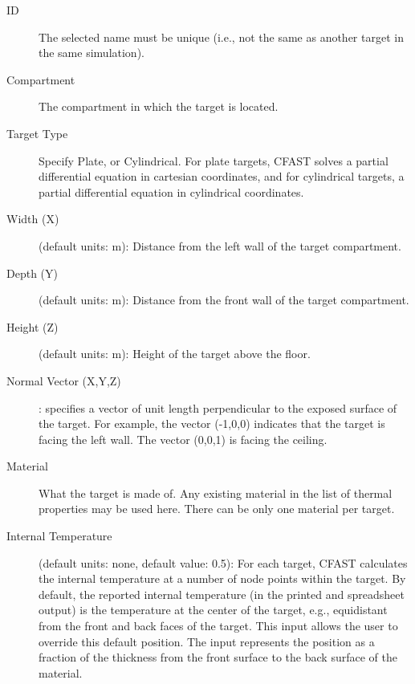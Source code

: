 \begin{description}
\item[ID] The selected name must be unique (i.e., not the same as another target in the same simulation).

\item[Compartment] The compartment in which the target is located.

\item[Target Type] Specify Plate, or Cylindrical.  For plate targets, CFAST solves a partial differential equation in cartesian coordinates, and for cylindrical targets, a partial differential equation in cylindrical coordinates.

\item[Width (X)] (default units: m): Distance from the left wall of the target compartment.

\item[Depth (Y)] (default units: m): Distance from the front wall of the target compartment.

\item[Height (Z)] (default units: m): Height of the target above the floor.

\item[Normal Vector (X,Y,Z)]: specifies a vector of unit length perpendicular to the exposed surface of the target. For example, the vector (-1,0,0) indicates that the target is facing the left wall. The vector (0,0,1) is facing the ceiling.

\item[Material] What the target is made of. Any existing material in the list of thermal properties may be used here. There can be only one material per target.

\item[Internal Temperature] (default units: none, default value: 0.5): For each target, CFAST calculates the internal temperature at a number of node points within the target. By default, the reported internal temperature (in the printed and spreadsheet output) is the temperature at the center of the target, e.g., equidistant from the front and back faces of the target. This input allows the user to override this default position. The input represents the position as a fraction of the thickness from the front surface to the back surface of the material.
\end{description}





